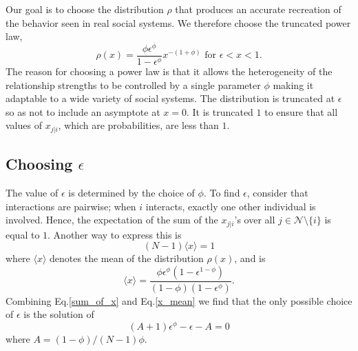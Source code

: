 \documentclass[10pt]{article}
\begin{document}
\begin{multicols}{2}
Our goal is to choose the distribution $\rho$ that produces an accurate recreation of the behavior seen in real social systems. We therefore choose the truncated power law,
\begin{equation}
\label{distribution_sup}
\rho(x)=\frac{\phi\epsilon^{\phi}}{1-\epsilon^{\phi}}x^{-(1+\phi)} \text{ for } \epsilon<x<1.
\end{equation}
The reason for choosing a power law is that it allows the heterogeneity of the relationship strengths to be controlled by a single parameter $\phi$ making it adaptable to a wide variety of social systems. The distribution is truncated at $\epsilon$ so as not to include an asymptote at $x=0$. It is truncated $1$ to ensure that all values of $x_{j|i}$, which are probabilities, are less than $1$.

\subsection{Choosing $\epsilon$}
\label{epsilon}
The value of $\epsilon$ is determined by the choice of $\phi$. To find $\epsilon$, consider that interactions are pairwise; when $i$ interacts, exactly one other individual is involved. Hence, the expectation of the sum of the $x_{j|i}$'s over all $j\in \mathcal{N}\setminus\{i\}$ is equal to $1$. Another way to express this is
\begin{equation}
\label{sum_of_x}
(N-1) \langle x \rangle = 1
\end{equation}
where $\langle x \rangle$ denotes the mean of the distribution $\rho(x)$, and is
\begin{equation}
\label{x_mean}
\langle x \rangle=\frac{\phi\epsilon^{\phi}(1-\epsilon^{1-\phi})}{(1-\phi)(1-\epsilon^{\phi})}.
\end{equation}
Combining Eq.\eqref{sum_of_x} and Eq.\eqref{x_mean} we find that the only possible choice of $\epsilon$ is the solution of
\begin{equation}
(A+1)\epsilon^{\phi}-\epsilon-A=0
\end{equation}
where $A=(1-\phi)/(N-1)\phi$. 


\end{multicols}
\end{document}
